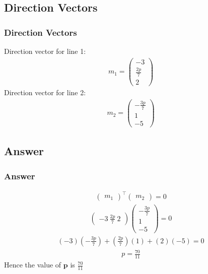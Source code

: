 \documentclass{beamer}
\theoremstyle{remark}
\newcommand{\myvec}[1]{\ensuremath{\begin{pmatrix}#1\end{pmatrix}}}
\let\vec\mathbf
\numberwithin{equation}{section}
\begin{document}
\subsection{Direction Vectors}
\begin{frame}
\frametitle{Direction Vectors}
Direction vector for line 1:
\begin{align}
m_1 = \myvec{-3 \\ \frac{2p}{7} \\ 2}
\end{align}
Direction vector for line 2:
\begin{align}
m_2 = \myvec{-\frac{3p}{7} \\ 1 \\ -5}
\end{align}
\end{frame}

\subsection{Answer}
\begin{frame}
\frametitle{Answer}
\begin{align}
\myvec{m_1}^\top\myvec{m_2} = 0 
\end{align}
\begin{align}
\myvec{-3 \ \frac{2p}{7} \ 2}\myvec{-\frac{3p}{7} \\ 1 \\ -5}=0  
\end{align}
\begin{align}
(-3)(-\frac{3p}{7}) + (\frac{2p}{7})(1) + (2)(-5) = 0  
\end{align}
\begin{align}
p = \frac{70}{11}
\end{align}
Hence the value of $\vec{p}$ is $\frac{70}{11}$
\end{frame}
\end{document}
